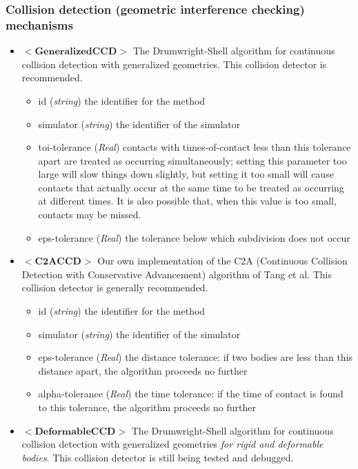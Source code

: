 \documentclass{article}
\begin{document}
\begin{landscape}
\subsubsection{Collision detection (geometric interference checking) mechanisms}
\begin{itemize}
\item $<\textbf{GeneralizedCCD}>$ The Drumwright-Shell algorithm for continuous collision detection with generalized geometries.  This collision detector is recommended.
\begin{itemize}
\item id  (\emph{string}) the identifier for the method
\item simulator  (\emph{string}) the identifier of the simulator 
\item toi-tolerance  (\emph{Real})  contacts with times-of-contact less than this tolerance apart are treated as occurring simultaneously; setting this parameter too large will slow things down slightly, but setting it too small will cause contacts that actually occur at the same time to be treated as occurring at different times.  It is also possible that, when this value is too small, contacts may be missed.
\item eps-tolerance  (\emph{Real}) the tolerance below which subdivision does not occur
\end{itemize} 
\item $<\textbf{C2ACCD}>$ Our own implementation of the C2A (Continuous Collision Detection with Conservative Advancement) algorithm of Tang et al. This collision detector is generally recommended.
\begin{itemize}
\item id  (\emph{string}) the identifier for the method
\item simulator  (\emph{string}) the identifier of the simulator 
\item eps-tolerance  (\emph{Real}) the distance tolerance: if two bodies are less than this distance apart, the algorithm proceeds no further 
\item alpha-tolerance  (\emph{Real}) the time tolerance: if the time of contact is found to this tolerance, the algorithm proceeds no further
\end{itemize} 
\item $<\textbf{DeformableCCD}>$ The Drumwright-Shell algorithm for continuous collision detection with generalized geometries \emph{for rigid and deformable bodies}.  This collision detector is still being tested and debugged.
\begin{itemize}

\end{itemize}
\end{itemize}
\end{landscape}
\end{document}
